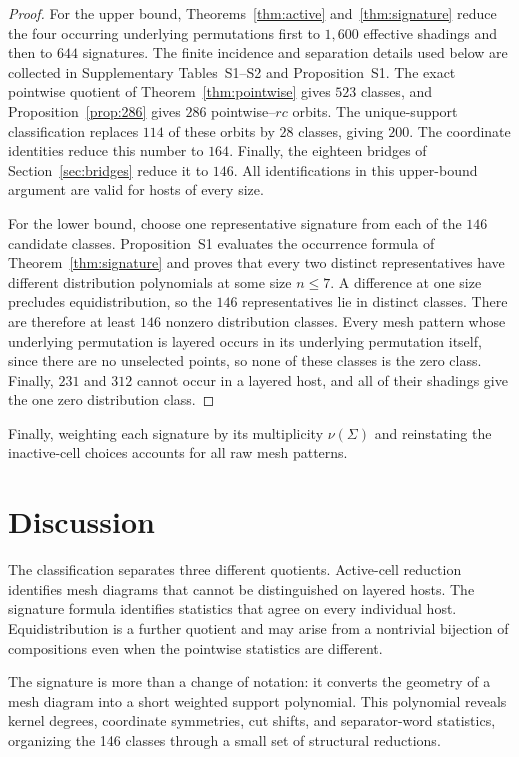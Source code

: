 \documentclass[12pt]{article}
\begin{document}
\begin{proof}
For the upper bound, Theorems~\ref{thm:active}
and~\ref{thm:signature} reduce the four occurring underlying permutations
first to $1{,}600$ effective shadings and then to $644$ signatures.  The finite
incidence and separation details used below are collected in Supplementary
Tables~S1--S2 and Proposition~S1.  The exact pointwise quotient of
Theorem~\ref{thm:pointwise} gives $523$ classes, and
Proposition~\ref{prop:286} gives $286$ pointwise--$rc$ orbits.  The
unique-support classification replaces $114$ of these orbits by $28$ classes,
giving $200$.  The coordinate identities reduce this number to $164$.
Finally, the eighteen bridges of Section~\ref{sec:bridges} reduce it to $146$.
All identifications in this upper-bound argument are valid for hosts of every
size.

For the lower bound, choose one representative signature from each of the
$146$ candidate classes.  Proposition~S1 evaluates the occurrence formula of
Theorem~\ref{thm:signature} and proves that every two distinct representatives
have different distribution polynomials at some size $n\le7$.  A difference
at one size precludes equidistribution, so the $146$ representatives lie in
distinct classes.
There are therefore at least $146$ nonzero distribution classes.  Every mesh
pattern whose underlying permutation is layered occurs in its underlying
permutation itself, since there are no unselected points, so none of these
classes is the zero class.  Finally, $231$ and $312$ cannot occur in a layered
host, and all of their shadings give the one zero distribution class.
\end{proof}

Finally, weighting each signature by its multiplicity $\nu(\Sigma)$ and
reinstating the inactive-cell choices accounts for all raw mesh patterns.

\section{Discussion}

The classification separates three different quotients.  Active-cell
reduction identifies mesh diagrams that cannot be distinguished on layered
hosts.  The signature formula identifies statistics that agree on every
individual host.  Equidistribution is a further quotient and may arise from a
nontrivial bijection of compositions even when the pointwise statistics are
different.

The signature is more than a change of notation: it converts the geometry of
a mesh diagram into a short weighted support polynomial.  This polynomial
reveals kernel degrees, coordinate symmetries, cut shifts, and separator-word
statistics, organizing the 146 classes through a small set of structural
reductions.
\end{document}
